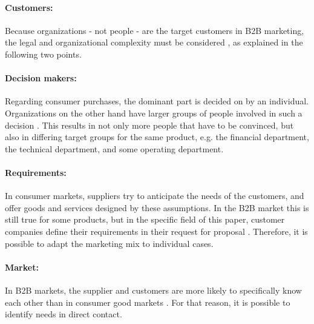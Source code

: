 \paragraph*{Customers:} 
Because organizations - not people - are the target customers in B2B marketing, the legal and organizational complexity must be considered \parencite[cf.][21]{Backhaus.2015b}, as explained in the following two points.

\paragraph*{Decision makers:} 
Regarding consumer purchases, the dominant part is decided on by an individual. Organizations on the other hand have larger groups of people involved in such a decision \parencite[cf.][21]{Backhaus.2015b}. This results in not only more people that have to be convinced, but also in differing target groups for the same product, e.g. the financial department, the technical department, and some operating department. 

\paragraph*{Requirements:} 
In consumer markets, suppliers try to anticipate the needs of the customers, and offer goods and services designed by these assumptions. In the B2B market this is still true for some products, but in the specific field of this paper, customer companies define their requirements in their request for proposal \parencite[cf.][22]{Backhaus.2015b}. Therefore, it is possible to adapt the marketing mix to individual cases.

\paragraph*{Market:} 
In B2B markets, the supplier and customers are more likely to specifically know each other than in consumer good markets \parencite[cf.][2]{Backhaus.2015b}. For that reason, it is possible to identify needs in direct contact.

